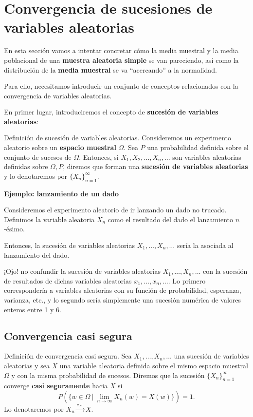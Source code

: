 \documentclass[]{book}
\begin{document}
\hypertarget{convergencia-de-sucesiones-de-variables-aleatorias}{%
\section{Convergencia de sucesiones de variables aleatorias}\label{convergencia-de-sucesiones-de-variables-aleatorias}}

En esta sección vamos a intentar concretar cómo la media muestral y la media poblacional de una \textbf{muestra aleatoria simple} se van pareciendo, así como la distribución de la \textbf{media muestral} se va ``acercando'' a la normalidad.

Para ello, necesitamos introducir un conjunto de conceptos relacionados con la convergencia de variables aleatorias.

En primer lugar, introduciremos el concepto de \textbf{sucesión de variables aleatorias}:

 Definición de sucesión de variables aleatorias.
Consideremos un experimento aleatorio sobre un \textbf{espacio muestral} \(\Omega\). Sea \(P\) una probabilidad definida sobre el conjunto de sucesos de \(\Omega\). Entonces, si \(X_1,X_2,\ldots,X_n,\ldots\) son variables aleatorias definidas sobre \(\Omega,P\), diremos que forman una \textbf{sucesión de variables aleatorias} y lo denotaremos por \(\{X_n\}_{n=1}^\infty\).

\textbf{Ejemplo: lanzamiento de un dado}

Consideremos el experimento aleatorio de ir lanzando un dado no trucado. Definimos la variable aleatoria \(X_n\) como el resultado del dado el lanzamiento \(n\)-ésimo.

Entonces, la sucesión de variables aleatorias \(X_1,\ldots,X_n,\ldots\) sería la asociada al lanzamiento del dado.

¡Ojo! no confundir la sucesión de variables aleatorias \(X_1,\ldots,X_n,\ldots\) con la sucesión de resultados de dichas variables aleatorias \(x_1,\ldots, x_n,\ldots\). Lo primero correspondería a variables aleatorias con su función de probabilidad, esperanza, varianza, etc., y lo segundo sería simplemente una sucesión numérica de valores enteros entre 1 y 6.

\hypertarget{convergencia-casi-segura}{%
\subsection{Convergencia casi segura}\label{convergencia-casi-segura}}

 Definición de convergencia casi segura.
Sea \(X_1,\ldots,X_n,\ldots\) una sucesión de variables aleatorias y sea \(X\) una variable aleatoria definida sobre el mismo espacio muestral \(\Omega\) y con la misma probabilidad de sucesos. Diremos que la sucesión \(\{X_n\}_{n=1}^\infty\) converge \textbf{casi seguramente} hacia \(X\) si
\[
P(\{w\in \Omega\ |\ \lim_{n\to\infty} X_n(w)=X(w)\})=1.
\]
Lo denotaremos por \(X_n\stackrel{c.s.}{\longrightarrow}X\).
\end{document}
